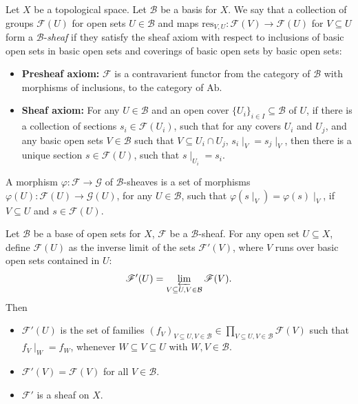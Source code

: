 \documentclass[11pt]{article}
\begin{document}
\begin{definition}
  Let $ X $ be a topological space. Let $ \mathcal{B} $ be a basis for $ X $. 
  We say that a collection of groups $\mathscr{F}(U)$ for open sets 
  $U \in \mathcal{B}$ and maps 
  $\mathrm{res}_{V, U} : \mathscr{F}(V ) \to  \mathscr{F}(U )$ 
  for $V \subseteq  U$ form a $\mathcal{B}$-\emph{sheaf} if they 
  satisfy the sheaf axiom with respect to inclusions 
  of basic open sets in basic open sets and 
  coverings of basic open sets by basic open sets: 
  \begin{itemize}
    \item \textbf{Presheaf axiom:} $\mathscr{F}$ is a contravarient 
    functor from the category of $\mathcal{B}$ with morphisms of inclusions, 
    to the category of $\mathrm{Ab}$. 
    \item \textbf{Sheaf axiom:} For any $U \in \mathcal{B}$ and an 
    open cover $\{U_{i}\}_{i \in I} \subseteq \mathcal{B}$ of $U$, 
    if there is a collection of sections 
    $s_{i} \in \mathscr{F}(U_{i})$, 
    such that for any covers $U_{i}$ and $U_{j}$, 
    and any basic open sets $V \in \mathcal{B}$ such that 
    $V \subseteq U_{i} \cap U_{j}$, $s_{i}\mid_{V}=s_{j}\mid_{V}$, 
    then there is a unique section $s \in \mathscr{F}(U)$, 
    such that $s \mid_{U_{i}}=s_{i}$.   
  \end{itemize}
  A morphism $\varphi:\mathscr{F} \to \mathscr{G}$ of $\mathcal{B}$-sheaves 
  is a set of morphisms $\varphi(U):\mathscr{F}(U) \to \mathscr{G}(U)$, 
  for any $U \in \mathcal{B}$, such that $\varphi(s\mid_{V})=\varphi(s)\mid_{V}$, 
  if $V \subseteq U$ and $s \in \mathscr{F}(U)$. 
\end{definition}

\begin{lemma}
  Let $\mathcal{B}$ be a base of open sets for $X$, 
  $\mathscr{F}$ be a $ \mathcal{B} $-sheaf. 
  For any open set $U \subseteq X$, define $\mathscr{F}(U)$ as the 
  inverse limit of the sets $\mathscr{F}'(V)$, where $V$ runs over 
  basic open sets contained in $U$: 
  $$\mathscr{F}'(U)= \varprojlim_{V \subseteq U, V \in \mathcal{B}} \mathscr{F}(V).$$
  Then 
  \begin{itemize}
    \item $\mathscr{F}'(U)$ is the set of families 
    $(f_{V})_{V \subseteq U,V \in \mathcal{B}} \in \prod_{V \subseteq U,V \in \mathcal{B}}\mathscr{F}(V)$ 
    such that $f_{V} \mid_{W}=f_{W}$, 
    whenever $W \subseteq V \subseteq U$ with $W,V \in \mathcal{B}$. 
    \item $\mathscr{F}'(V)=\mathscr{F}(V)$ for all $V \in \mathcal{B}$. 
    \item $\mathscr{F}'$ is a sheaf on $X$. 
  \end{itemize}
\end{lemma}
\end{document}

